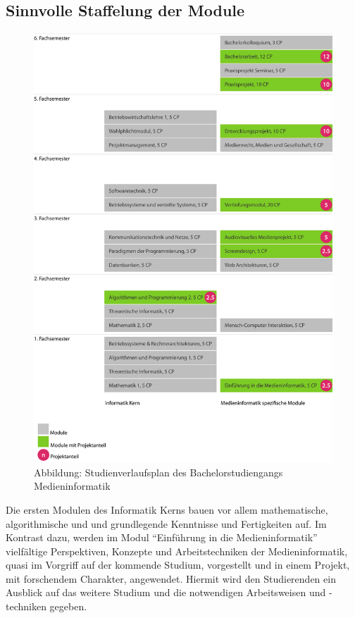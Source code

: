 \subsection{Sinnvolle Staffelung der
Module}\label{sinnvolle-staffelung-der-module}

\begin{figure}[htbp]
\centering
\includegraphics[width=\columnwidth]{../anhaenge/bilder/ba-verlaufsplan.png}
\caption{Abbildung: Studienverlaufsplan des Bachelorstudiengangs
Medieninformatik}
\end{figure}

Die ersten Modulen des Informatik Kerns bauen vor allem mathematische,
algorithmische und und grundlegende Kenntnisse und Fertigkeiten auf. Im
Kontrast dazu, werden im Modul ``Einführung in die Medieninformatik''
vielfältige Perspektiven, Konzepte und Arbeitstechniken der
Medieninformatik, quasi im Vorgriff auf der kommende Studium,
vorgestellt und in einem Projekt, mit forschendem Charakter, angewendet.
Hiermit wird den Studierenden ein Ausblick auf das weitere Studium und
die notwendigen Arbeitsweisen und -techniken gegeben.

